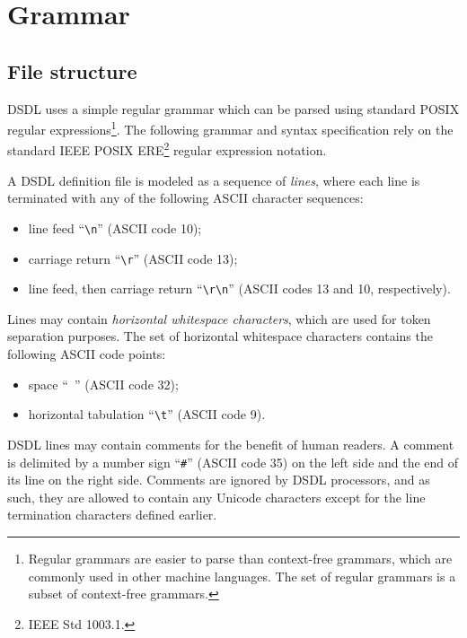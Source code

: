 \section{Grammar}

\subsection{File structure}

DSDL uses a simple regular grammar which can be parsed using standard POSIX regular
expressions\footnote{Regular grammars are easier to parse than context-free grammars,
which are commonly used in other machine languages. The set of regular grammars is a subset of context-free grammars.}.
The following grammar and syntax specification rely on the standard IEEE POSIX ERE\footnote{IEEE Std 1003.1.}
regular expression notation.

A DSDL definition file is modeled as a sequence of \emph{lines},
where each line is terminated with any of the following ASCII character sequences:

\begin{itemize}
    \item line feed ``\texttt{\textbackslash{}n}'' (ASCII code 10);
    \item carriage return ``\texttt{\textbackslash{}r}'' (ASCII code 13);
    \item line feed, then carriage return ``\texttt{\textbackslash{}r\textbackslash{}n}''
    (ASCII codes 13 and 10, respectively).
\end{itemize}

Lines may contain \emph{horizontal whitespace characters}, which are used for token separation purposes.
The set of horizontal whitespace characters contains the following ASCII code points:

\begin{itemize}
    \item space ``\texttt{ }'' (ASCII code 32);
    \item horizontal tabulation ``\texttt{\textbackslash{}t}'' (ASCII code 9).
\end{itemize}

DSDL lines may contain comments for the benefit of human readers.
A comment is delimited by a number sign ``\verb|#|'' (ASCII code 35) on the left side
and the end of its line on the right side.
Comments are ignored by DSDL processors, and as such,
they are allowed to contain any Unicode characters except for the line termination characters defined earlier.

